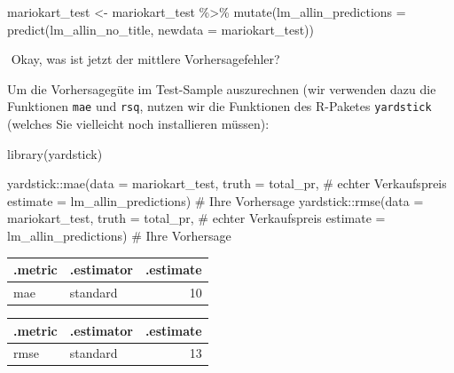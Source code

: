 \documentclass[
  letterpaper,
  twoside,
  open=any]{scrbook}
\newenvironment{Shaded}{\begin{snugshade}}{\end{snugshade}}
\newcommand{\AttributeTok}[1]{\textcolor[rgb]{0.40,0.45,0.13}{#1}}
\newcommand{\CommentTok}[1]{\textcolor[rgb]{0.37,0.37,0.37}{#1}}
\newcommand{\FunctionTok}[1]{\textcolor[rgb]{0.28,0.35,0.67}{#1}}
\newcommand{\NormalTok}[1]{\textcolor[rgb]{0.00,0.23,0.31}{#1}}
\newcommand{\OtherTok}[1]{\textcolor[rgb]{0.00,0.23,0.31}{#1}}
\newcommand{\SpecialCharTok}[1]{\textcolor[rgb]{0.37,0.37,0.37}{#1}}
\theoremstyle{definition}
\theoremstyle{definition}
\theoremstyle{definition}
\theoremstyle{remark}
\begin{document}
\begin{Shaded}
\begin{Highlighting}[]
\NormalTok{mariokart\_test }\OtherTok{\textless{}{-}}
\NormalTok{  mariokart\_test }\SpecialCharTok{\%\textgreater{}\%} 
  \FunctionTok{mutate}\NormalTok{(}\AttributeTok{lm\_allin\_predictions =} \FunctionTok{predict}\NormalTok{(lm\_allin\_no\_title, }\AttributeTok{newdata =}\NormalTok{ mariokart\_test))}
\end{Highlighting}
\end{Shaded}

{}️ Okay, was ist jetzt der mittlere Vorhersagefehler?

Um die Vorhersagegüte im Test-Sample auszurechnen (wir verwenden dazu
die Funktionen \texttt{mae} und \texttt{rsq}, nutzen wir die Funktionen
des R-Paketes \texttt{yardstick} (welches Sie vielleicht noch
installieren müssen):

\begin{Shaded}
\begin{Highlighting}[]
\FunctionTok{library}\NormalTok{(yardstick)}

\NormalTok{yardstick}\SpecialCharTok{::}\FunctionTok{mae}\NormalTok{(}\AttributeTok{data =}\NormalTok{ mariokart\_test,}
               \AttributeTok{truth =}\NormalTok{ total\_pr,  }\CommentTok{\# echter Verkaufspreis}
               \AttributeTok{estimate =}\NormalTok{ lm\_allin\_predictions)  }\CommentTok{\# Ihre Vorhersage}
\NormalTok{yardstick}\SpecialCharTok{::}\FunctionTok{rmse}\NormalTok{(}\AttributeTok{data =}\NormalTok{ mariokart\_test,}
               \AttributeTok{truth =}\NormalTok{ total\_pr,  }\CommentTok{\# echter Verkaufspreis}
               \AttributeTok{estimate =}\NormalTok{ lm\_allin\_predictions)  }\CommentTok{\# Ihre Vorhersage}
\end{Highlighting}
\end{Shaded}

\begin{longtable}[]{@{}llr@{}}
\toprule\noalign{}
.metric & .estimator & .estimate \\
\midrule\noalign{}
\endhead
\bottomrule\noalign{}
\endlastfoot
mae & standard & 10 \\
\end{longtable}

\begin{longtable}[]{@{}llr@{}}
\toprule\noalign{}
.metric & .estimator & .estimate \\
\midrule\noalign{}
\endhead
\bottomrule\noalign{}
\endlastfoot
rmse & standard & 13 \\
\end{longtable}
\end{document}
